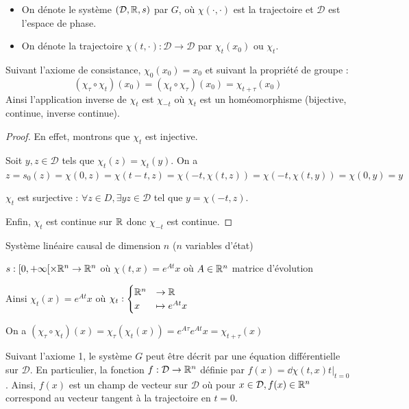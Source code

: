 \documentclass[main.tex]{subfiles}
\newcommand{\D}{\mathcal{D}}
\begin{document}
\begin{rem}
\begin{itemize}
\item On dénote le système $(\D,\R,s)$ par $G$, où $\chi(\cdot,\cdot)$ est la trajectoire et $\D$ est l'espace de phase.
\item On dénote la trajectoire $\chi(t,\cdot) : \D \rightarrow\D$ par $\chi_t(x_0)$ ou $\chi_t$.
\end{itemize}
\end{rem}
\begin{prop}
Suivant l'axiome de consistance, $\chi_0(x_0)=x_0$ et suivant la propriété de groupe :
\[ (\chi_{\tau} \circ \chi_t)(x_0) = (\chi_t \circ \chi_{\tau})(x_0) = \chi_{t+\tau}(x_0) \]
Ainsi l'application inverse de $\chi_t$ est $\chi_{-t}$ où $\chi_t$ est un homéomorphisme (bijective, continue, inverse continue).
\end{prop}
\begin{proof}
En effet, montrons que $\chi_t$ est injective.

Soit $y,z\in \D$ tels que $\chi_t(z)=\chi_t(y)$.
On a $z=s_0(z)=\chi(0,z)=\chi(t-t,z)=\chi(-t,\chi(t,z))=\chi(-t,\chi(t,y))=\chi(0,y)=y$

$\chi_t$ est surjective : $\forall z \in D, \exists y z\in \D$ tel que $y=\chi(-t,z)$.

Enfin, $\chi_t$ est continue sur $\mathbb{R}$ donc $\chi_{-t}$ est continue.
\end{proof}
\begin{exemple}
Système linéaire causal de dimension $n$ ($n$ variables d'état)

$s:[0,+\infty[ \times \mathbb{R}^n \rightarrow \mathbb{R}^n$ où $\chi(t,x)=e^{At}x$ où $A\in\mathbb{R}^n$ matrice d'évolution

Ainsi $\chi_t(x) = e^{At}x$ où $\chi_t :
\begin{cases}
\mathbb{R}^n & \rightarrow \mathbb{R}\\x & \mapsto e^{At}x
\end{cases}
$

On a $(\chi_{\tau} \circ \chi_t) (x) = \chi_{\tau}(\chi_t(x)) = e^{A\tau}e^{At}x = \chi_{t+\tau}(x)$
\end{exemple}

\begin{prop}
Suivant l'axiome 1, le système $G$ peut être décrit par une équation différentielle sur $\D$. En particulier, la fonction $f:\D \rightarrow \R^n$ définie par $f(x) = \dd{\chi(t,x)}{t}|_{t=0}$. Ainsi, $f(x)$ est un champ de vecteur sur $\D$ où pour $x\in\D,f(x)\in\R^n$ correspond au vecteur tangent à la trajectoire en $t=0$.
\end{prop}
\end{document}
